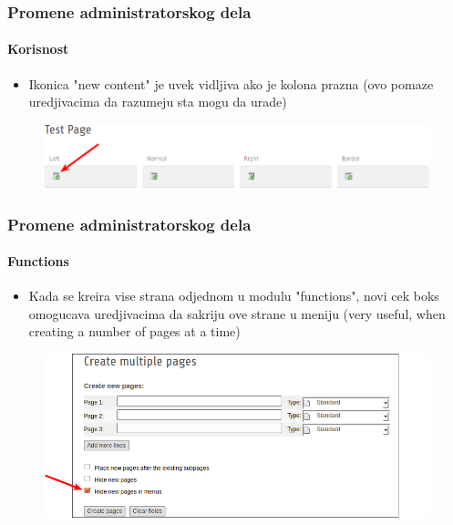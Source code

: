 
\begin{frame}[fragile]
	\frametitle{Promene administratorskog dela}
	\framesubtitle{Korisnost}

 	\begin{itemize}
		\item Ikonica "new content" je uvek vidljiva ako je kolona prazna\newline
			\small(ovo pomaze uredjivacima da razumeju sta mogu da urade)\normalsize
	\end{itemize}

	\begin{figure}
		\includegraphics[width=0.95\linewidth]{Images/BackendChanges/NewContentIconAlwaysVisible.png}
	\end{figure}

\end{frame}


\begin{frame}[fragile]
	\frametitle{Promene administratorskog dela}
	\framesubtitle{Functions}

 	\begin{itemize}
		\item Kada se kreira vise strana odjednom u modulu "functions", novi cek boks omogucava uredjivacima da sakriju ove strane u meniju\newline
			\small(very useful, when creating a number of pages at a time)\normalsize
	\end{itemize}

	\begin{figure}
		\includegraphics[width=0.85\linewidth]{Images/BackendChanges/CreateMultiplePagesHideInMenu.png}
	\end{figure}

\end{frame}

